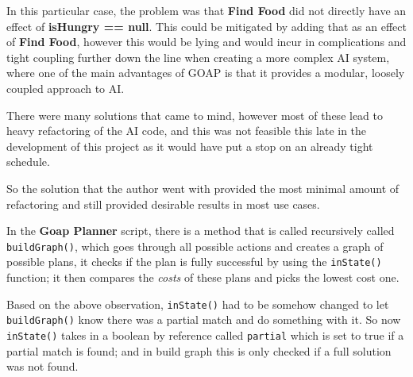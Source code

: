 \documentclass[11pt]{report}
\begin{document}
In this particular case, the problem was that \textbf{Find Food} did not directly have an effect of \textbf{isHungry == null}. This could be mitigated by adding that as an effect of \textbf{Find Food}, however this would be lying and would incur in complications and tight coupling further down the line when creating a more complex AI system, where one of the main advantages of GOAP is that it provides a modular, loosely coupled approach to AI.

There were many solutions that came to mind, however most of these lead to heavy refactoring of the AI code, and this was not feasible this late in the development of this project as it would have put a stop on an already tight schedule.

So the solution that the author went with provided the most minimal amount of refactoring and still provided desirable results in most use cases.

In the \textbf{Goap Planner} script, there is a method that is called recursively called \lstinline{buildGraph()}, which goes through all possible actions and creates a graph of possible plans, it checks if the plan is fully successful by using the \lstinline{inState()} function; it then compares the \textit{costs} of these plans and picks the lowest cost one.

Based on the above observation, \lstinline{inState()}  had to be somehow changed to let \lstinline{buildGraph()} know there was a partial match and do something with it. So now \lstinline{inState()} takes in a boolean by reference called \lstinline{partial} which is set to true if a partial match is found; and in build graph this is only checked if a full solution was not found.
\end{document}

